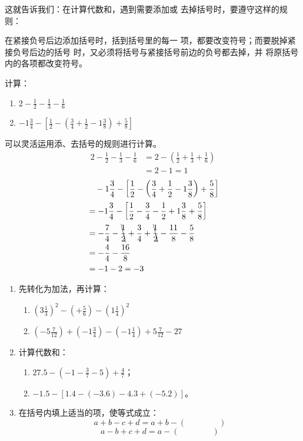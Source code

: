这就告诉我们：在计算代数和，遇到需要添加或
去掉括号时，要遵守这样的规则：

\begin{blk}{}
   在紧接负号后边添加括号时，括到括号里的每一
项，都要改变符号；而要脱掉紧接负号后边的括号
时，又必须将括号与紧接括号前边的负号都去掉，并
将原括号内的各项都改变符号。
\end{blk}
   


\begin{example}
    计算：
\begin{enumerate}
    \item $2-\frac{1}{2}-\frac{1}{3}-\frac{1}{6}$
    \item $-1\frac{3}{4}-\left[\frac{1}{2}-\left(\frac{3}{4}+\frac{1}{2}-1\frac{3}{8}\right)+\frac{5}{8}\right]$
\end{enumerate}
\end{example}

\begin{solution}
    可以灵活运用添、去括号的规则进行计算。
\[ \begin{split}
    2-\frac{1}{2}-\frac{1}{3}-\frac{1}{6}&=2-\left(\frac{1}{2}+\frac{1}{3}+\frac{1}{6}\right)\\
    &=2-1=1
\end{split}  \]
\[ \begin{split}
    &\quad -1\frac{3}{4}-\left[\frac{1}{2}-\left(\frac{3}{4}+\frac{1}{2}-1\frac{3}{8}\right)+\frac{5}{8}\right]\\
    &=-1\frac{3}{4}-\left[\frac{1}{2}-\frac{3}{4}-\frac{1}{2}+1\frac{3}{8}+\frac{5}{8}\right]\\
    &=-\frac{7}{4}-\bcancel{\frac{1}{2}}+\frac{3}{4}+\bcancel{\frac{1}{2}}-\frac{11}{8}-\frac{5}{8}\\
    &=-\frac{4}{4}-\frac{16}{8}\\
    &=-1-2=-3
\end{split}  \]
\end{solution}

\begin{ex}
\begin{enumerate}
    \item 先转化为加法，再计算：
    \begin{enumerate}
        \item $\left(3\frac{1}{3}\right)^2-\left(+\frac{5}{6}\right)-\left(1\frac{1}{4}\right)^2$
        \item $\left(-5\frac{7}{12}\right)+\left(-1\frac{3}{4}\right)-\left(-1\frac{1}{4}\right)+5\frac{7}{12}-27$
    \end{enumerate}
    \item 计算代数和：
    \begin{enumerate}
        \item $27.5-\left(-1-\frac{3}{7}-5\right)+\frac{4}{7}$；
        \item $-1.5-[1.4-(-3.6)-4.3+(-5.2)]$。
    \end{enumerate}
    \item 在括号内填上适当的项，使等式成立：
    \[a+b-c+d=a+b-(\qquad \qquad )\]
       \[ a-b+c+d=a-(\qquad \qquad )     \]
\end{enumerate}    
\end{ex}

